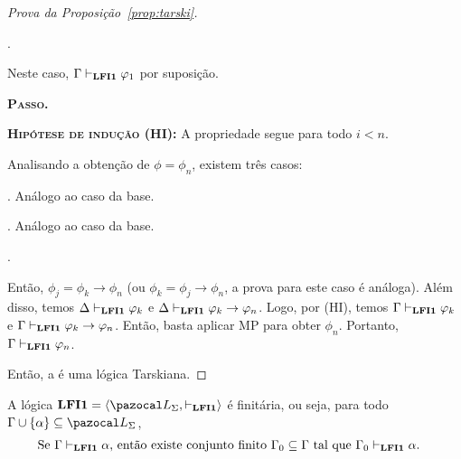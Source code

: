 \begin{proof}[Prova da Proposição~\ref{prop:tarski}]
\begin{adjustwidth}{1cm}{}
\begin{adjustwidth}{1cm}{}
\begin{provaporcasos}
                    \casodeprova{$\phi_1 \in \Delta$}. 
                    
                        Neste caso, $\Gamma \vdash_{{\normalfont\textbf{LFI1}}{}} \varphi_1$ por suposição.
                \end{provaporcasos}

                \noindent\textbf{\textsc{Passo.}} 
                
                \noindent \textbf{\textsc{Hipótese de indução (HI):}} A propriedade segue para todo $i < n$.

                Analisando a obtenção de $\phi = \phi_n$, existem três casos:
                \begin{provaporcasos}
                    . Análogo ao caso da base.
                    
                    . Análogo ao caso da base.
                    
                    .
                    
                    Então, $\phi_j = \phi_k \to \phi_n$ (ou $\phi_k = \phi_j \to \phi_n$, a prova para este caso é análoga). Além disso, temos $\Delta \vdash_{{\normalfont\textbf{LFI1}}{}} \varphi_k$ e $\Delta \vdash_{{\normalfont\textbf{LFI1}}{}} \varphi_k \to \varphi_n$. Logo, por (HI), temos $\Gamma \vdash_{{\normalfont\textbf{LFI1}}{}} \varphi_k$ e $\Gamma \vdash_{{\normalfont\textbf{LFI1}}{}} \varphi_k \to \varphi_n$. Então, basta aplicar MP para obter $\phi_n$. Portanto, $\Gamma \vdash_{{\normalfont\textbf{LFI1}}{}} \varphi_n$.
                \end{provaporcasos}
            \end{adjustwidth}
        \end{adjustwidth}

            Então, a \lfium{} é uma lógica Tarskiana. \qedhere
            
        \end{proof}

        
        \begin{proposicao}\label{prop:finit}        
            A lógica $\lfium{} = \langle \ling, \conhil \rangle$ é finitária, ou seja, para todo $\Gamma \cup \{\alpha\} \subseteq \ling{}$,
            \begin{align*}
                & \text{Se } \Gamma \vdash_{{\normalfont\textbf{LFI1}}{}} \alpha \text{, então existe conjunto finito } \Gamma_{0} \subseteq \Gamma \text{ tal que } \Gamma_{0} \vdash_{{\normalfont\textbf{LFI1}}{}} \alpha.
            \end{align*}
        \end{proposicao}

